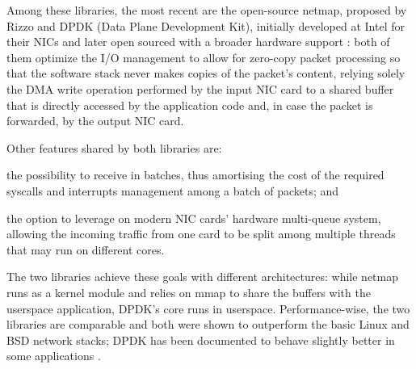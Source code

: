 \documentclass[11pt,a4paper,twoside,titlepage,openany]{book}
\begin{document}
Among these libraries, the most recent are the open-source netmap, proposed by Rizzo \cite{netmap} and DPDK (Data Plane Development Kit), initially developed at Intel for their NICs and later open sourced with a broader hardware support \cite{dpdk}%
: both of them optimize the I/O management to allow for zero-copy packet processing so that the software stack never makes copies of the packet's content, relying solely the \gls{DMA} write operation performed by the input NIC card to a shared buffer that is directly accessed by the application code and, in case the packet is forwarded, by the output NIC card.

Other features shared by both libraries are:
\begin{inlineenum}
\item the possibility to receive in batches, thus amortising the cost of the required syscalls and interrupts management among a batch of packets; and
\item the option to leverage on modern NIC cards' hardware multi-queue system, allowing the incoming traffic from one card to be split among multiple threads that may run on different cores.
\end{inlineenum}
The two libraries achieve these goals with different architectures: while netmap runs as a kernel module and relies on mmap to share the buffers with the userspace application, DPDK's core runs in userspace.
Performance-wise, the two libraries are comparable and both were shown to outperform the basic Linux and BSD network stacks; DPDK has been documented to behave slightly better in some applications \cite{fastclick}.
\end{document}
